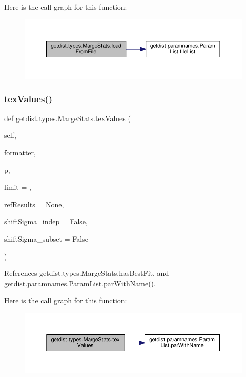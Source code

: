Here is the call graph for this function\+:
\nopagebreak
\begin{figure}[H]
\begin{center}
\leavevmode
\includegraphics[width=350pt]{classgetdist_1_1types_1_1MargeStats_a9192b3334c2fc85bbe5fec3ca93af501_cgraph}
\end{center}
\end{figure}
\mbox{\label{classgetdist_1_1types_1_1MargeStats_af205f6fbc53eabcc4c0138def3b93d30}} 
\subsubsection{\texorpdfstring{tex\+Values()}{texValues()}}
{\footnotesize\ttfamily def getdist.\+types.\+Marge\+Stats.\+tex\+Values (\begin{DoxyParamCaption}\item[{}]{self,  }\item[{}]{formatter,  }\item[{}]{p,  }\item[{}]{limit = {},  }\item[{}]{ref\+Results = {\ttfamily None},  }\item[{}]{shift\+Sigma\+\_\+indep = {\ttfamily False},  }\item[{}]{shift\+Sigma\+\_\+subset = {\ttfamily False} }\end{DoxyParamCaption})}



References getdist.\+types.\+Marge\+Stats.\+has\+Best\+Fit, and getdist.\+paramnames.\+Param\+List.\+par\+With\+Name().

Here is the call graph for this function\+:
\nopagebreak
\begin{figure}[H]
\begin{center}
\leavevmode
\includegraphics[width=350pt]{classgetdist_1_1types_1_1MargeStats_af205f6fbc53eabcc4c0138def3b93d30_cgraph}
\end{center}
\end{figure}


